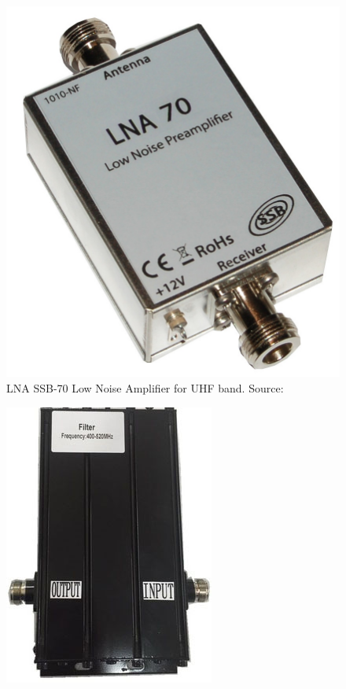 \begin{minipage}{\linewidth}
    \centering
    \begin{minipage}{0.45\linewidth}
        \begin{figure}[H]
            \centering
            \includegraphics[width=0.3\paperwidth]{img/4/ssb_lna70.jpg}
            \caption{LNA SSB-70 Low Noise Amplifier for UHF band. Source: \cite{ssb_lna70}}
            \label{ssb_lna70}
        \end{figure}
    \end{minipage}
    \hspace{0.05\linewidth}
    \begin{minipage}{0.45\linewidth}
        \begin{figure}[H]
            \centering
            \includegraphics[width=0.3\paperwidth]{img/4/cavity_uhf.jpg}

\end{figure}
\end{minipage}
\end{minipage}
